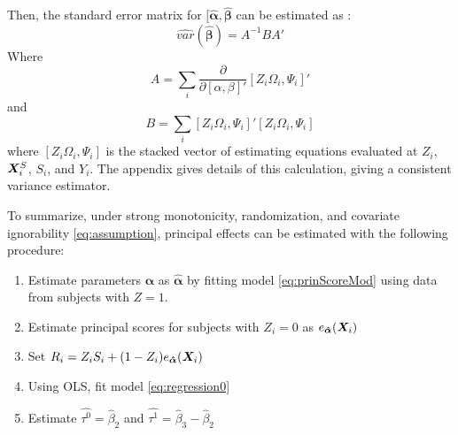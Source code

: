 \documentclass[11pt]{article} %
\begin{document}
Then, the standard error matrix for $[\bm{\hat{\alpha}},\bm{\hat{\beta}}$ can be estimated as \citep[][ch. 7]{boosStefanskiBook}:
\begin{equation}\label{eq:sandwich}
  \widehat{var}(\bm{\hat{\beta}})=A^{-1}BA'
\end{equation}
Where
\begin{equation}\label{eq:Amat}
  A=\sum_i\frac{\partial}{\partial [\alpha,\beta]'} [Z_i\Omega_i,\Psi_i]'
\end{equation}
and
\begin{equation}\label{eq:Bmat}
  B=\sum_i [Z_i\Omega_i, \Psi_i]'[Z_i\Omega_i, \Psi_i]
\end{equation}
where $[Z_i \Omega_i, \Psi_i]$ is the stacked vector of estimating equations evaluated at $Z_i$, $\bm{X}^S_i$, $S_i$, and $Y_i$.
The appendix gives details of this calculation, giving a consistent variance estimator.

To summarize, under strong monotonicity, randomization, and covariate ignorability \eqref{eq:assumption}, principal effects can be estimated with the following procedure:
\begin{enumerate}
\item Estimate parameters $\bm{\alpha}$ as $\bm{\hat{\alpha}}$ by fitting model \eqref{eq:prinScoreMod} using data from subjects with $Z=1$.
\item Estimate principal scores for subjects with $Z_i=0$ as $e_{\bm{\hat{\alpha}}}(\bm{X}_i)$
\item Set $R_i=Z_iS_i+(1-Z_i)e_{\bm{\hat{\alpha}}}(\bm{X}_i)$
\item Using OLS, fit model \eqref{eq:regression0}
\item Estimate $\hat{\tau^0}=\hat{\beta}_2$ and $\hat{\tau^1}=\hat{\beta}_3-\hat{\beta}_2$
\end{enumerate}
\end{document}
